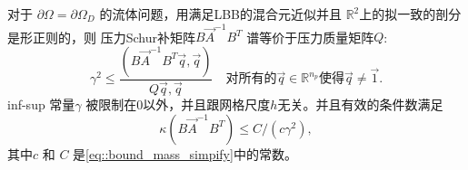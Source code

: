         \begin{theorem}
            \label{theo_mass_spectrual_eq} 对于 $\partial \Omega = \partial \Omega_D$ 的流体问题，用满足LBB的混合元近似并且 $\mathbb{R}^2$上的拟一致的剖分是形正则的，则
            压力Schur补矩阵$B \vec{A}^{-1} B^T$ 谱等价于压力质量矩阵$Q$:
            \begin{equation}
                \gamma^2 \leq \frac{(B \vec{A}^{-1} B^T \vec{q}, \vec{q})}{Q\vec{q},\vec{q}} \quad \mbox{对所有的} \vec{q} \in \mathbb{R}^{n_p} \mbox{使得} \vec{q} \neq \vec{1}.
                \label{eq::lower_uper_bound}
            \end{equation}
            inf-sup 常量$\gamma$ 被限制在$0$以外，并且跟网格尺度$h$无关。并且有效的条件数满足
            \begin{equation}
                \kappa(B\vec{A}^{-1}B^T) \leq C/(c\gamma^2),
            \end{equation}
            其中$c$ 和 $C$ 是\eqref{eq::bound_mass_simpify}中的常数。
        \end{theorem}

